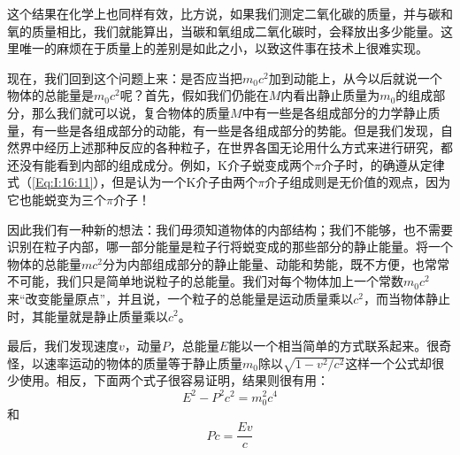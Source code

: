 这个结果在化学上也同样有效，比方说，如果我们测定二氧化碳的质量，并与碳和氧的质量相比，我们就能算出，当碳和氧组成二氧化碳时，会释放出多少能量。这里唯一的麻烦在于质量上的差别是如此之小，以致这件事在技术上很难实现。

现在，我们回到这个问题上来：是否应当把$m_0c^2$加到动能上，从今以后就说一个物体的总能量是$m_0c^2$呢？首先，假如我们仍能在$M$内看出静止质量为$m_0$的组成部分，那么我们就可以说，复合物体的质量$M$中有一些是各组成部分的力学静止质量，有一些是各组成部分的动能，有一些是各组成部分的势能。但是我们发现，自然界中经历上述那种反应的各种粒子，在世界各国无论用什么方式来进行研究，都还没有能看到内部的组成成分。例如，K介子蜕变成两个$\pi$介子时，的确遵从定律式（\ref{Eq:I:16:11}），但是认为一个K介子由两个$\pi$介子组成则是无价值的观点，因为它也能蜕变为三个$\pi$介子！

因此我们有一种新的想法：我们毋须知道物体的内部结构；我们不能够，也不需要识别在粒子内部，哪一部分能量是粒子行将蜕变成的那些部分的静止能量。将一个物体的总能量$mc^2$分为内部组成部分的静止能量、动能和势能，既不方便，也常常不可能，我们只是简单地说粒子的总能量。我们对每个物体加上一个常数$m_0c^2$来“改变能量原点”，并且说，一个粒子的总能量是运动质量乘以$c^2$，而当物体静止时，其能量就是静止质量乘以$c^2$。

最后，我们发现速度$v$，动量$P$，总能量$E$能以一个相当简单的方式联系起来。很奇怪，以速率运动的物体的质量等于静止质量$m_0$除以$\sqrt{1-v^2/c^2}$这样一个公式却很少使用。相反，下面两个式子很容易证明，结果则很有用：
\begin{equation}
    \label{Eq:I:16:13}
    E^2-P^2c^2=m_0^2c^4
\end{equation}
和
\begin{equation}
    \label{Eq:I:16:14}
    Pc=\frac{Ev}{c}
\end{equation}
